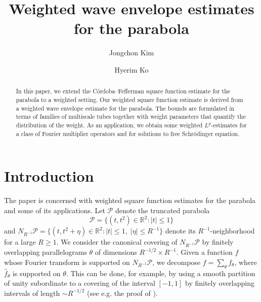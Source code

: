 \documentclass[11pt]{amsart}
\title{Weighted wave envelope estimates for the parabola}
\author[Jongchon Kim]{Jongchon Kim}
\author[Hyerim Ko]{Hyerim Ko}
\theoremstyle{definition}
\theoremstyle{remark}
\renewcommand{\hat}{\widehat}
\newcommand{\R}{\mathbb{R}}
\newcommand{\cP}{\mathcal{P}}
\begin{document}

\begin{abstract}
In this paper, we extend the C\'ordoba--Fefferman square function estimate for the parabola to a weighted setting. Our weighted square function estimate is derived from a weighted wave envelope estimate for the parabola. The bounds are formulated in terms of families of multiscale tubes together with weight parameters that quantify the distribution of the weight. As an application, we obtain some weighted $L^p$-estimates for a class of Fourier multiplier operators and for solutions to free Schr\"{o}dinger equation.
\end{abstract}

\maketitle

\section{Introduction}
The paper is concerned with weighted square function estimates for the parabola and some of its applications. Let $\cP$ denote the truncated parabola 
\[\mathcal P=\{(t,t^2)\in \R^2: |t|\le 1\}\]
and $N_{R^{-1}} \cP = \{(t,t^2+\eta)\in \R^2: |t|\le 1,\; |\eta| \leq R^{-1} \}$ denote its $R^{-1}$-neighborhood for a large $R\geq 1$.  We consider the canonical covering of $N_{R^{-1}} \cP$ by finitely overlapping parallelograms $\theta$ of dimensions $R^{-1/2}\times R^{-1}$. Given a function $f$ whose Fourier transform is supported on $N_{R^{-1}} \cP$, we decompose $f=\sum_\theta f_\theta$, where $\hat f_\theta$ is supported on $\theta$. 
This can be done, for example, by using a smooth partition of unity subordinate to a covering of the interval $[-1,1]$ by finitely overlapping intervals of length $\sim R^{-1/2}$ (see e.g. the proof of ).
\end{document}
